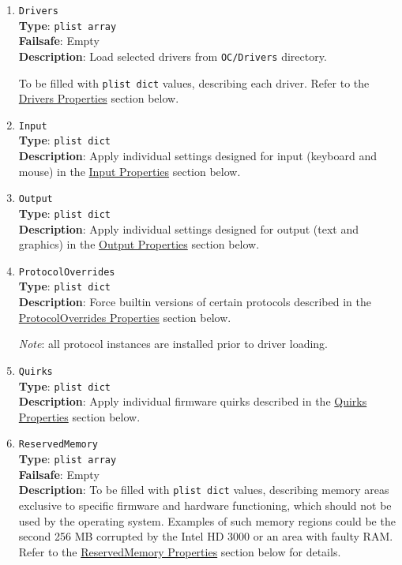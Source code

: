 \documentclass[]{article}
\begin{document}
\begin{enumerate}
  \emph{Note}: Some types of firmware, particularly those made by Apple, only connect the boot
  drive to speed up the boot process. Enable this option to be able to see all the
  boot options when running multiple drives.

\item
  \texttt{Drivers}\\
  \textbf{Type}: \texttt{plist\ array}\\
  \textbf{Failsafe}: Empty\\
  \textbf{Description}: Load selected drivers from \texttt{OC/Drivers} directory.

  To be filled with \texttt{plist\ dict} values, describing each driver.
  Refer to the \hyperref[uefidriversprops]{Drivers Properties} section below.

\item
  \texttt{Input}\\
  \textbf{Type}: \texttt{plist\ dict}\\
  \textbf{Description}: Apply individual settings designed for input (keyboard and mouse) in the
  \hyperref[uefiinputprops]{Input Properties} section below.

\item
  \texttt{Output}\\
  \textbf{Type}: \texttt{plist\ dict}\\
  \textbf{Description}: Apply individual settings designed for output (text and graphics) in the
  \hyperref[uefioutputprops]{Output Properties} section below.

\item
  \texttt{ProtocolOverrides}\\
  \textbf{Type}: \texttt{plist\ dict}\\
  \textbf{Description}: Force builtin versions of certain protocols described
  in the \hyperref[uefiprotoprops]{ProtocolOverrides Properties} section below.

  \emph{Note}: all protocol instances are installed prior to driver loading.

\item
  \texttt{Quirks}\\
  \textbf{Type}: \texttt{plist\ dict}\\
  \textbf{Description}: Apply individual firmware quirks described in the
  \hyperref[uefiquirkprops]{Quirks Properties} section below.

\item
  \texttt{ReservedMemory}\\
  \textbf{Type}: \texttt{plist\ array}\\
  \textbf{Failsafe}: Empty\\
  \textbf{Description}: To be filled with \texttt{plist\ dict} values,
  describing memory areas exclusive to specific firmware and hardware functioning,
  which should not be used by the operating system. Examples of such memory regions
  could be the second 256 MB corrupted by the Intel HD 3000 or an area with faulty RAM.
  Refer to the \hyperref[uefirsvdprops]{ReservedMemory Properties} section below for details.


\end{enumerate}
\end{document}
